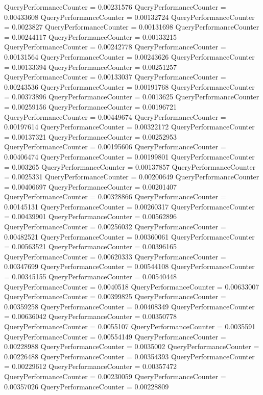 \documentclass[9pt]{article}
\theoremstyle{plain}
\theoremstyle{definition}
\theoremstyle{remark}
\numberwithin{equation}{section}
\begin{document}
QueryPerformanceCounter  =  0.00231576
QueryPerformanceCounter  =  0.00433608
QueryPerformanceCounter  =  0.00132724
QueryPerformanceCounter  =  0.0023827
QueryPerformanceCounter  =  0.00131698
QueryPerformanceCounter  =  0.00244117
QueryPerformanceCounter  =  0.00133215
QueryPerformanceCounter  =  0.00242778
QueryPerformanceCounter  =  0.00131564
QueryPerformanceCounter  =  0.00243626
QueryPerformanceCounter  =  0.00133394
QueryPerformanceCounter  =  0.00251257
QueryPerformanceCounter  =  0.00133037
QueryPerformanceCounter  =  0.00243536
QueryPerformanceCounter  =  0.00191768
QueryPerformanceCounter  =  0.00373896
QueryPerformanceCounter  =  0.0013625
QueryPerformanceCounter  =  0.00259156
QueryPerformanceCounter  =  0.00196721
QueryPerformanceCounter  =  0.00449674
QueryPerformanceCounter  =  0.00197614
QueryPerformanceCounter  =  0.00322172
QueryPerformanceCounter  =  0.00137321
QueryPerformanceCounter  =  0.00252953
QueryPerformanceCounter  =  0.00195606
QueryPerformanceCounter  =  0.00406474
QueryPerformanceCounter  =  0.00199801
QueryPerformanceCounter  =  0.003265
QueryPerformanceCounter  =  0.00137857
QueryPerformanceCounter  =  0.0025331
QueryPerformanceCounter  =  0.00200649
QueryPerformanceCounter  =  0.00406697
QueryPerformanceCounter  =  0.00201407
QueryPerformanceCounter  =  0.00328866
QueryPerformanceCounter  =  0.00145131
QueryPerformanceCounter  =  0.00260317
QueryPerformanceCounter  =  0.00439901
QueryPerformanceCounter  =  0.00562896
QueryPerformanceCounter  =  0.00256032
QueryPerformanceCounter  =  0.00482521
QueryPerformanceCounter  =  0.00360061
QueryPerformanceCounter  =  0.00563521
QueryPerformanceCounter  =  0.00396165
QueryPerformanceCounter  =  0.00620333
QueryPerformanceCounter  =  0.00347699
QueryPerformanceCounter  =  0.00544108
QueryPerformanceCounter  =  0.00345155
QueryPerformanceCounter  =  0.00540448
QueryPerformanceCounter  =  0.0040518
QueryPerformanceCounter  =  0.00633007
QueryPerformanceCounter  =  0.00399825
QueryPerformanceCounter  =  0.00359258
QueryPerformanceCounter  =  0.00408349
QueryPerformanceCounter  =  0.00636042
QueryPerformanceCounter  =  0.00350778
QueryPerformanceCounter  =  0.0055107
QueryPerformanceCounter  =  0.0035591
QueryPerformanceCounter  =  0.00554149
QueryPerformanceCounter  =  0.00228988
QueryPerformanceCounter  =  0.0035002
QueryPerformanceCounter  =  0.00226488
QueryPerformanceCounter  =  0.00354393
QueryPerformanceCounter  =  0.00229612
QueryPerformanceCounter  =  0.00357472
QueryPerformanceCounter  =  0.00230059
QueryPerformanceCounter  =  0.00357026
QueryPerformanceCounter  =  0.00228809
\end{document}
